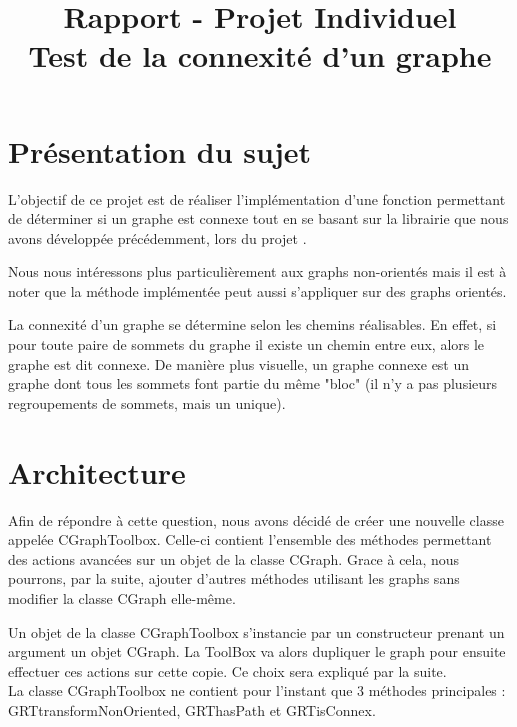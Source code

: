
\title{Rapport - Projet Individuel \\\Large Test de la connexité d'un graphe}
\fancyhf{}
\lhead{\leftmark}


	\maketitle
	\tableofcontents
	\chapter{Présentation du sujet}
		L'objectif de ce projet est de réaliser l'implémentation d'une fonction permettant de déterminer si un graphe est connexe tout en se basant sur la librairie que nous avons développée précédemment, lors du projet .		
		
		Nous nous intéressons plus particulièrement aux graphs non-orientés mais il est à noter que la méthode implémentée peut aussi s'appliquer sur des graphs orientés.
		
		La connexité d'un graphe se détermine selon les chemins réalisables. En effet, si pour toute paire de sommets du graphe il existe un chemin entre eux, alors le graphe est dit connexe. De manière plus visuelle, un graphe connexe est un graphe dont tous les sommets font partie du même "bloc" (il n'y a pas plusieurs regroupements de sommets, mais un unique).
	
	\chapter{Architecture}
		Afin de répondre à cette question, nous avons décidé de créer une nouvelle classe appelée CGraphToolbox. Celle-ci contient l'ensemble des méthodes permettant des actions avancées sur un objet de la classe CGraph. Grace à cela, nous pourrons, par la suite, ajouter d'autres méthodes utilisant les graphs sans modifier la classe CGraph elle-même.
		
		Un objet de la classe CGraphToolbox s'instancie par un constructeur prenant un argument un objet CGraph. La ToolBox va alors dupliquer le graph pour ensuite effectuer ces actions sur cette copie. Ce choix sera expliqué par la suite.\\
		
		La classe CGraphToolbox ne contient pour l'instant que 3 méthodes principales : GRTtransformNonOriented, GRThasPath et GRTisConnex.\\
		
